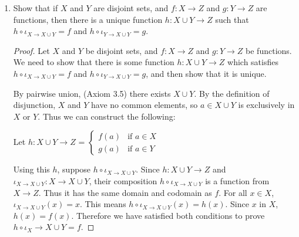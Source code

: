 \documentclass[../../main.tex]{subfiles}
\begin{document}
\begin{enumerate}
\begin{proof}
        By the function composition rule (Definition 3.3.13), $f \circ f^{-1}$ is a function from $B \to B$. Since by definition $\iota_{B \to B}$ is from $B \to B$ as well, their domains and codomains agree.

        Since $f$ is bijective, for all $a \in A$, there exists exactly one $b \in B$ such that $f \; a \mapsto b$. We defined $f^{-1}$ as the function $b \mapsto a$. Then $f \circ f^{-1}$ is the function $(b \mapsto a) \mapsto b$, in other words $f \circ f^{-1}(b)=b$. We also know $\iota_{B \to B}(b)=b$. Thus $f \circ f^{-1} = \iota_{B \to B}$.

        The other part is very similar. $f^{-1} \circ f$ is a function from $A \to A$, which we also know is true of $\iota_{A \to A}$. Then $f^{-1} \circ f$ is the function $(a \mapsto b) \mapsto a$,in other words $f^{-1} \circ f(a)=a$. Likewise $\iota_{A \to A}(a)=a$. Thus $f^{-1} \circ f = \iota_{A \to A}$, and we have completed our proof.
    \end{proof}

    \item 
    \begin{q}
        Show that if $X$ and $Y$ are disjoint sets, and $f: X \to Z$ and $g: Y \to Z$ are functions, then there is a unique function $h: X \cup Y \to Z$ such that $h \circ \iota_{X \to X \cup Y} = f$ and $h \circ \iota_{Y \to X \cup Y} = g.$
    \end{q}

    
    \begin{proof}
        Let $X$ and $Y$ be disjoint sets, and $f: X \to Z$ and $g: Y \to Z$ be functions.
        We need to show that there is some function $h: X \cup Y \to Z$ which satisfies $h \circ \iota_{X \to X \cup Y} = f$ and $h \circ \iota_{Y \to X \cup Y} = g$, and then show that it is unique.
    
        By pairwise union, (Axiom 3.5) there exists $X \cup Y$. By the definition of disjunction, $X$ and $Y$ have no common elements, so $a \in X \cup Y$ is exclusively in $X$ or $Y$. Thus we can construct the following:
    
        Let $h: X \cup Y \to Z$ = \(
            \begin{cases}
                f(a) & \text{if } a \in X \\
                g(a) & \text{if } a \in Y
            \end{cases}
        \)

        Using this $h$, suppose $h \circ \iota_{X \to X \cup Y}$.
        Since $h: X \cup Y \to Z$ and $\iota_{X \to X \cup Y}: X \to X \cup Y$, their composition $h \circ \iota_{X \to X \cup Y}$ is a function from $X \to Z$. 
        Thus it has the same domain and codomain as $f$.
        For all $x \in X$, $\iota_{X \to X \cup Y}(x)=x$.
        This means $h \circ \iota_{X \to X \cup Y}(x) = h(x)$. Since $x$ in $X$, $h(x) = f(x)$.
        Therefore we have satisfied both conditions to prove $h \circ \iota_X \to X \cup Y = f$.


\end{proof}
\end{enumerate}
\end{document}
